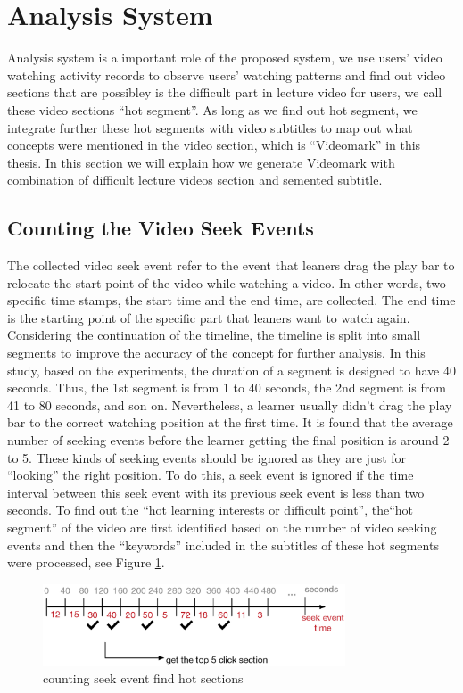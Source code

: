 \section{Analysis System}
Analysis system is a important role of the proposed system, we use users' video watching activity records to observe users' watching patterns and find out video sections that are possibley is the difficult part in lecture video for users, we call these video sections ``hot segment''.
As long as we find out hot segment, we integrate further these hot segments with video subtitles to map out what concepts were mentioned in the video section, which is ``Videomark'' in this thesis.
In this section we will explain how we generate Videomark with combination of difficult lecture videos section and semented subtitle.

\subsection{Counting the Video Seek Events}
The collected video seek event refer to the event that leaners drag the play bar to relocate the start point of the video while watching a video. In other words, two specific time stamps, the start time and the end time, are collected. The end time is the starting point of the specific part that leaners want to watch again.
Considering the continuation of the timeline, the timeline is split into small segments to improve the accuracy of the concept for further analysis. In this study, based on the experiments, the duration of a segment is designed to have 40 seconds. Thus, the 1st segment is from 1 to 40 seconds, the 2nd segment is from 41 to 80 seconds, and son on.
Nevertheless, a learner usually didn’t drag the play bar to the correct watching position at the first time. It is found that the average number of seeking events before the learner getting the final position is around 2 to 5. These kinds of seeking events should be ignored as they are just for “looking” the right position. To do this, a seek event is ignored if the time interval between this seek event with its previous seek event is less than two seconds.
To find out the ``hot learning interests or difficult point'', the``hot segment'' of the video are first identified based on the number of video seeking events and then the ``keywords'' included in the subtitles of these hot segments were processed, see Figure \ref{fig:countseek}.

\begin{figure}[H]
    \centering
    \includegraphics[width = 0.8\textwidth]{fig/countseek.eps}
    \caption{counting seek event find hot sections}
    \label{fig:countseek}
\end{figure}

